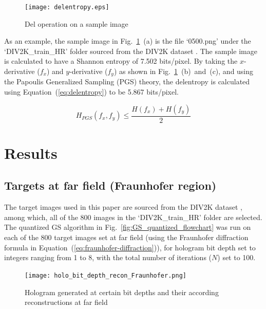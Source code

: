 	\begin{figure} [ht]
	   \begin{center}
	   \texttt{[image: delentropy.eps]}
	   \end{center}
	   \caption{\label{fig:delentropy} Del operation on a sample image}
	\end{figure} 
	
	As an example, the sample image in Fig.~\ref{fig:delentropy}~(a) is the file `0500.png' under the `DIV2K\_train\_HR' folder sourced from the DIV2K dataset \cite{Agustsson2017}. The sample image is calculated to have a Shannon entropy of 7.502 bits/pixel. By taking the $x$-derivative ($f_x$) and $y$-derivative ($f_y$) as shown in Fig.~\ref{fig:delentropy}~(b)~and~(c), and using the Papoulis Generalized Sampling (PGS) \cite{Papoulis1977} theory, the delentropy is calculated using Equation~(\ref{eq:delentropy})\cite{Larkin2016} to be 5.867 bits/pixel.
	
	\begin{equation}
		H_{PGS}(f_x, f_y) \leq \frac{H(f_x) + H(f_y)}{2}
		\label{eq:delentropy}
	\end{equation}
	
	
	
\section{Results}
\subsection{Targets at far field (Fraunhofer region)} \label{sec:Fraunhofer_results}
	The target images used in this paper are sourced from the DIV2K dataset \cite{Agustsson2017}, among which, all of the 800 images in the `DIV2K\_train\_HR' folder are selected. The quantized GS algorithm in Fig.~\ref{fig:GS_quantized_flowchart} was run on each of the 800 target images set at far field (using the Fraunhofer diffraction formula in Equation~(\ref{eq:fraunhofer-diffraction})), for hologram bit depth set to integers ranging from 1 to 8, with the total number of iterations ($N$) set to 100. 
	
	\begin{figure} [ht]
	   \begin{center}
	   \texttt{[image: holo\_bit\_depth\_recon\_Fraunhofer.png]}
	   \end{center}
	   \caption{\label{fig:holo_bit_depth_recon_Fraunhofer} Hologram generated at certain bit depths and their according reconstructions at far field}
	\end{figure} 
	
